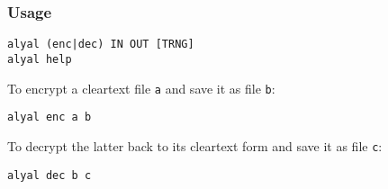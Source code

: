 \documentclass[twocolumn,hidelinks]{article}
\begin{document}
\subsubsection{Usage}

\begin{verbatim}
alyal (enc|dec) IN OUT [TRNG]
alyal help
\end{verbatim}

To encrypt a cleartext file \texttt{a} and save it as file \texttt{b}:
\begin{verbatim}
alyal enc a b
\end{verbatim}

To decrypt the latter back to its cleartext form and save it as file
\texttt{c}:
\begin{verbatim}
alyal dec b c
\end{verbatim}
\end{document}
